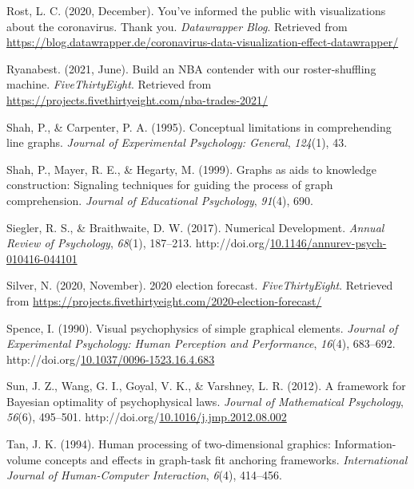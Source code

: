 \documentclass[print]{nuthesis}
\newlength{\cslhangindent}
\newenvironment{CSLReferences}%
{\setlength{\parindent}{0pt}%
\everypar{\setlength{\hangindent}{\cslhangindent}}\ignorespaces}%
{\par}
\begin{document}
\begin{CSLReferences}{1}{0}
\leavevmode\hypertarget{ref-rost_2020}{}%
Rost, L. C. (2020, December). You've informed the public with visualizations about the coronavirus. Thank you. \emph{Datawrapper Blog}. Retrieved from \url{https://blog.datawrapper.de/coronavirus-data-visualization-effect-datawrapper/}

\leavevmode\hypertarget{ref-ryanabest_2021}{}%
Ryanabest. (2021, June). Build an NBA contender with our roster-shuffling machine. \emph{FiveThirtyEight}. Retrieved from \url{https://projects.fivethirtyeight.com/nba-trades-2021/}

\leavevmode\hypertarget{ref-shah1995conceptual}{}%
Shah, P., \& Carpenter, P. A. (1995). Conceptual limitations in comprehending line graphs. \emph{Journal of Experimental Psychology: General}, \emph{124}(1), 43.

\leavevmode\hypertarget{ref-shah1999graphs}{}%
Shah, P., Mayer, R. E., \& Hegarty, M. (1999). Graphs as aids to knowledge construction: Signaling techniques for guiding the process of graph comprehension. \emph{Journal of Educational Psychology}, \emph{91}(4), 690.

\leavevmode\hypertarget{ref-siegler_numerical_2017}{}%
Siegler, R. S., \& Braithwaite, D. W. (2017). Numerical {Development}. \emph{Annual Review of Psychology}, \emph{68}(1), 187--213. http://doi.org/\href{https://doi.org/10.1146/annurev-psych-010416-044101}{10.1146/annurev-psych-010416-044101}

\leavevmode\hypertarget{ref-natesilver538_2020}{}%
Silver, N. (2020, November). 2020 election forecast. \emph{FiveThirtyEight}. Retrieved from \url{https://projects.fivethirtyeight.com/2020-election-forecast/}

\leavevmode\hypertarget{ref-spence_visual_1990}{}%
Spence, I. (1990). Visual psychophysics of simple graphical elements. \emph{Journal of Experimental Psychology: Human Perception and Performance}, \emph{16}(4), 683--692. http://doi.org/\href{https://doi.org/10.1037/0096-1523.16.4.683}{10.1037/0096-1523.16.4.683}

\leavevmode\hypertarget{ref-sun_framework_2012}{}%
Sun, J. Z., Wang, G. I., Goyal, V. K., \& Varshney, L. R. (2012). A framework for {Bayesian} optimality of psychophysical laws. \emph{Journal of Mathematical Psychology}, \emph{56}(6), 495--501. http://doi.org/\href{https://doi.org/10.1016/j.jmp.2012.08.002}{10.1016/j.jmp.2012.08.002}

\leavevmode\hypertarget{ref-tan1994human}{}%
Tan, J. K. (1994). Human processing of two-dimensional graphics: Information-volume concepts and effects in graph-task fit anchoring frameworks. \emph{International Journal of Human-Computer Interaction}, \emph{6}(4), 414--456.


\end{CSLReferences}
\end{document}
